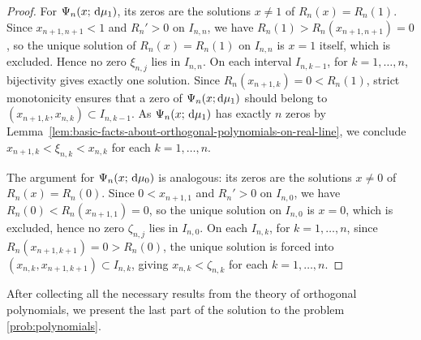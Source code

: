 \documentclass[reqno, a4paper]{amsart}
\renewcommand{\d}{\text{\rm d}}
\theoremstyle{plain}
\theoremstyle{definition}
\theoremstyle{remarkstyle}
\numberwithin{equation}{section}
\begin{document}
\begin{proof}
For $\Psi_n(x;\,\d\mu_1)$, its zeros are the solutions $x \neq 1$
of $R_n(x) = R_n(1)$. Since $x_{n+1,n+1} < 1$ and $R_n' > 0$ on $I_{n,n}$, we have $R_n(1) > R_n(x_{n+1,n+1}) = 0$, so the unique solution of
$R_n(x) = R_n(1)$ on $I_{n,n}$ is $x = 1$ itself, which is excluded. Hence no zero $\xi_{n,j}$ lies in $I_{n,n}$. On each interval $I_{n,k-1}$, for $k = 1,\ldots,n$, bijectivity gives exactly one solution. Since $R_n(x_{n+1,k}) = 0 < R_n(1)$, strict monotonicity ensures that a zero of $\Psi_{n}(x; \d\mu_1)$ should belong to $(x_{n+1,k}, x_{n,k}) \subset I_{n,k-1}$. As $\Psi_n(x;\,\d\mu_1)$ has exactly $n$ zeros by Lemma~\ref{lem:basic-facts-about-orthogonal-polynomials-on-real-line}, we conclude $x_{n+1,k} < \xi_{n,k} < x_{n,k}$ for each $k = 1,\ldots,n$.

The argument for $\Psi_n(x;\,\d\mu_0)$ is analogous: its zeros are
the solutions $x \neq 0$ of $R_n(x) = R_n(0)$.
Since $0 < x_{n+1,1}$ and $R_n' > 0$ on $I_{n,0}$, we have
$R_n(0) < R_n(x_{n+1,1}) = 0$, so the unique solution on $I_{n,0}$
is $x = 0$, which is excluded, hence no zero $\zeta_{n,j}$ lies in $I_{n, 0}$. On each $I_{n,k}$, for $k = 1,\ldots,n$, since $R_n(x_{n+1,k+1}) = 0 > R_n(0)$, the unique solution is forced into $(x_{n,k}, x_{n+1,k+1}) \subset I_{n,k}$, giving $x_{n,k} < \zeta_{n,k}$ for each $k = 1,\ldots,n$.
\end{proof}


After collecting all the necessary results from the theory of orthogonal polynomials, we present the last part of the solution to the problem \ref{prob:polynomials}.
\end{document}
